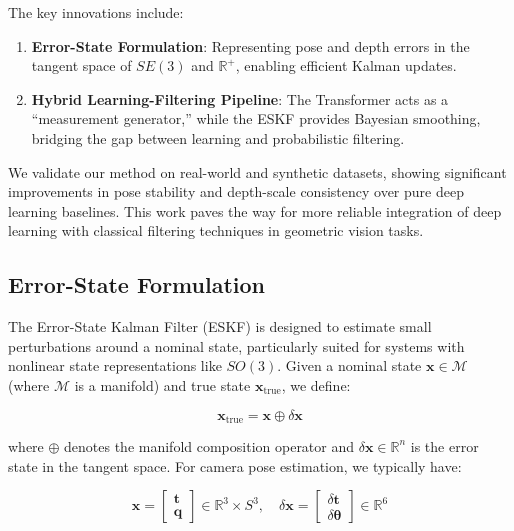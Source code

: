 The key innovations include:
\begin{enumerate}
	\item \textbf{Error-State Formulation}: Representing pose and depth errors in the tangent space of $SE(3)$ and $\mathbb{R}^+$, enabling efficient Kalman updates.
	\item \textbf{Hybrid Learning-Filtering Pipeline}: The Transformer acts as a ``measurement generator,'' while the ESKF provides Bayesian smoothing, bridging the gap between learning and probabilistic filtering.
\end{enumerate}

We validate our method on real-world and synthetic datasets, showing significant improvements in pose stability and depth-scale consistency over pure deep learning baselines. This work paves the way for more reliable integration of deep learning with classical filtering techniques in geometric vision tasks.

\subsection{Error-State Formulation}
The Error-State Kalman Filter (ESKF) is designed to estimate small perturbations around a nominal state, particularly suited for systems with nonlinear state representations like $SO(3)$. Given a nominal state $\mathbf{x} \in \mathcal{M}$ (where $\mathcal{M}$ is a manifold) and true state $\mathbf{x}_\text{true}$, we define:

\begin{equation}
	\mathbf{x}_\text{true} = \mathbf{x} \oplus \delta\mathbf{x}
\end{equation}

where $\oplus$ denotes the manifold composition operator and $\delta\mathbf{x} \in \mathbb{R}^n$ is the error state in the tangent space. For camera pose estimation, we typically have:

\begin{equation}
	\mathbf{x} = \begin{bmatrix}
		\mathbf{t} \\ \mathbf{q}
	\end{bmatrix} \in \mathbb{R}^3 \times S^3, \quad
	\delta\mathbf{x} = \begin{bmatrix}
		\delta\mathbf{t} \\ \delta\boldsymbol{\theta}
	\end{bmatrix} \in \mathbb{R}^6
\end{equation}

